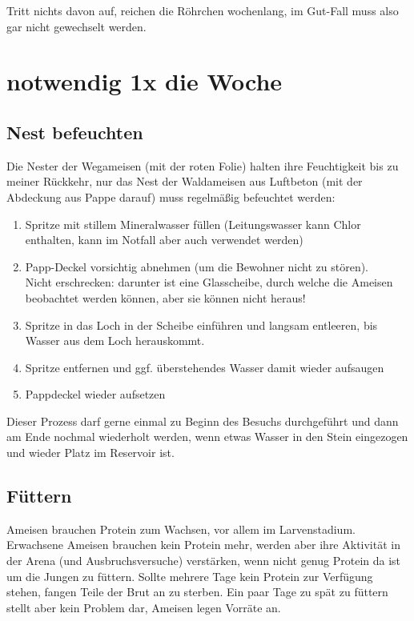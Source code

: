 Tritt nichts davon auf, reichen die Röhrchen wochenlang, im Gut-Fall muss also gar nicht gewechselt werden.

\section{notwendig 1x die Woche}

\subsection{Nest befeuchten}\label{sec:Ameisen_sub:Befeuchten}
Die Nester der Wegameisen (mit der roten Folie) halten ihre Feuchtigkeit bis zu meiner Rückkehr,
nur das Nest der Waldameisen aus Luftbeton (mit der Abdeckung aus Pappe darauf) muss regelmäßig befeuchtet werden:
\begin{enumerate}
  \item Spritze mit stillem Mineralwasser füllen
        (Leitungswasser kann Chlor enthalten, kann im Notfall aber auch verwendet werden)
  \item Papp-Deckel vorsichtig abnehmen (um die Bewohner nicht zu stören).\\
        Nicht erschrecken: darunter ist eine Glasscheibe, durch welche die Ameisen beobachtet werden können, aber sie können nicht heraus!
  \item Spritze in das Loch in der Scheibe einführen und langsam entleeren, bis Wasser aus dem Loch herauskommt.
  \item Spritze entfernen und ggf. überstehendes Wasser damit wieder aufsaugen
  \item Pappdeckel wieder aufsetzen
\end{enumerate}
Dieser Prozess darf gerne einmal zu Beginn des Besuchs durchgeführt und dann am Ende nochmal wiederholt werden,
wenn etwas Wasser in den Stein eingezogen und wieder Platz im Reservoir ist.

\subsection{Füttern}\label{sec:Ameisen_sub:Fuettern}
Ameisen brauchen Protein zum Wachsen, vor allem im Larvenstadium.
Erwachsene Ameisen brauchen kein Protein mehr, werden aber ihre Aktivität in der Arena
(und Ausbruchsversuche) verstärken, wenn nicht genug Protein da ist um die Jungen zu füttern.
Sollte mehrere Tage kein Protein zur Verfügung stehen, fangen Teile der Brut an zu sterben.
Ein paar Tage zu spät zu füttern stellt aber kein Problem dar, Ameisen legen Vorräte an.

